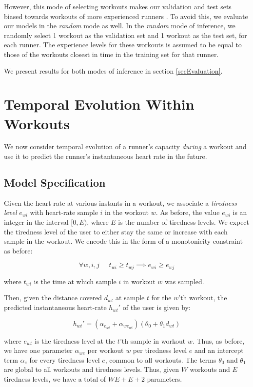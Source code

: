 \documentclass{acm_proc_article-sp}
\begin{document}
However, this mode of selecting workouts makes our validation and test sets biased towards workouts of more experienced runners \cite{www13}. To avoid this, we evaluate our models in the \emph{random} mode as well. In the \emph{random} mode of inference, we randomly select 1 workout as the validation set and 1 workout as the test set, for each runner. The experience levels for these workouts is assumed to be equal to those of the workouts closest in time in the training set for that runner. 

We present results for both modes of inference in section \ref{secEvaluation}.

\section{Temporal Evolution Within \\ Workouts}
\label{secTemporalModelWorkouts}
We now consider temporal evolution of a runner's capacity \emph{during} a workout and use it to predict the runner's instantaneous heart rate in the future. 

\subsection{Model Specification}

Given the heart-rate at various instants in a workout, we associate a \emph{tiredness level} $e_{wi}$ with heart-rate sample $i$ in the workout $w$. As before, the value $e_{wi}$ is an integer in the interval $[0, E)$, where $E$ is the number of tiredness levels. We expect the tiredness level of the user to either stay the same or increase with each sample in the workout. We encode this in the form of a monotonicity constraint as before:

$$\forall w,i,j \;\;\;\;\; t_{wi} \geq t_{wj} \implies e_{wi} \geq e_{wj}$$

where $t_{wi}$ is the time at which sample $i$ in workout $w$ was sampled.

Then, given the distance covered $d_{wt}$ at sample $t$ for the $w$'th workout, the predicted instantaneous heart-rate $h_{wt}'$ of the user is given by:

\begin{equation}
\label{eqnModelInstHr}
h_{wt}' = (\alpha_{e_{wt}} + \alpha_{we_{wt}})(\theta_0 + \theta_1 d_{wt})
\end{equation}

where $e_{wt}$ is the tiredness level at the $t$'th sample in workout $w$. Thus, as before, we have one parameter $\alpha_{we}$ per workout $w$ per tiredness level $e$ and an intercept term $\alpha_e$ for every tiredness level $e$, common to all workouts. The terms $\theta_0$ and $\theta_1$ are global to all workouts and tiredness levels. Thus, given $W$ workouts and $E$ tiredness levels, we have a total of $WE + E + 2$ parameters.
\end{document}
